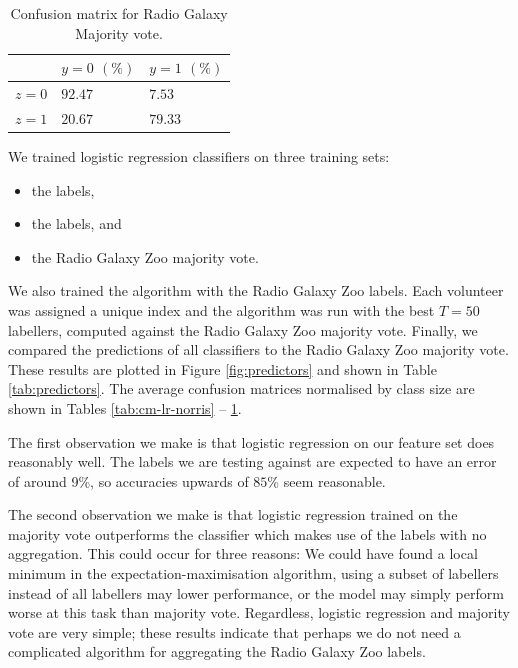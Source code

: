     \begin{table}
      \centering
      \begin{tabular}{l|ll}
          & $y = 0$  $(\%)$ & $y = 1$ $(\%)$ \\\hline
          $z = 0$ & $92.47$ & $7.53$ \\
          $z = 1$ & $20.67$ & $79.33$ \\
      \end{tabular}
      \caption{Confusion matrix for Radio Galaxy Majority vote.}
      \label{tab:cm-rgz-raw-mv}
    \end{table}

    We trained logistic regression classifiers on three training sets:
    \begin{itemize}
      \item the \citeauthor{norris06} labels,
      \item the \citeauthor{fan15} labels, and
      \item the Radio Galaxy Zoo majority vote.
    \end{itemize}
    We also trained the \citeauthor{raykar10} algorithm with the Radio Galaxy
    Zoo labels. Each volunteer was assigned a unique index and the algorithm was
    run with the best $T = 50$ labellers, computed against the Radio Galaxy Zoo
    majority vote. Finally, we compared the predictions of all classifiers to
    the Radio Galaxy Zoo majority vote. These results are plotted in Figure
    \ref{fig:predictors} and shown in Table \ref{tab:predictors}. The average
    confusion matrices normalised by class size are shown in Tables
    \ref{tab:cm-lr-norris} -- \ref{tab:cm-rgz-raw-mv}.

    The first observation we make is that logistic regression on our feature set
    does reasonably well. The \citeauthor{norris06} labels we are testing
    against are expected to have an error of around 9\%, so accuracies upwards
    of $85\%$ seem reasonable.

    The second observation we make is that logistic regression trained on the
    majority vote outperforms the \citeauthor{raykar10} classifier which makes
    use of the labels with no aggregation. This could occur for three reasons:
    We could have found a local minimum in the expectation-maximisation
    algorithm, using a subset of labellers instead of all labellers may lower
    performance, or the \citeauthor{raykar10} model may simply perform worse at
    this task than majority vote. Regardless, logistic regression and majority
    vote are very simple; these results indicate that perhaps we do not need a
    complicated algorithm for aggregating the Radio Galaxy Zoo labels.

